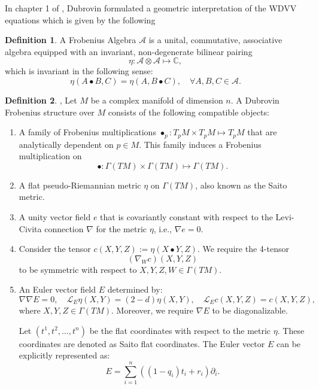 \documentclass{article}
\theoremstyle{definition}
\newtheorem{definition}{Definition}[section]
\begin{document}
In chapter 1 of \cite{B. Dubrovin2}, Dubrovin formulated a geometric interpretation of the WDVV equations which is given by the following

\begin{definition}
A Frobenius Algebra $\mathcal{A}$ is a unital, commutative, associative algebra equipped with an invariant, non-degenerate bilinear pairing 
\begin{equation*}
\eta : \mathcal{A} \otimes \mathcal{A} \mapsto \mathbb{C},
\end{equation*}
which is invariant in the following sense:
\begin{equation*}
\eta(A \bullet B, C) = \eta(A, B \bullet C), \quad \forall A, B, C \in \mathcal{A}.
\end{equation*}
\end{definition}


\begin{definition} \cite{B. Dubrovin2},\cite{B. Dubrovin3}
Let $M$ be a complex manifold of dimension $n$. A Dubrovin Frobenius structure over $M$ consists of the following compatible objects:
\begin{enumerate}
\item A family of Frobenius multiplications $\bullet_p : T_pM \times T_pM \mapsto T_pM$ that are analytically dependent on $p \in M$. This family induces a Frobenius multiplication on 
\begin{equation*}
\bullet : \Gamma(TM) \times \Gamma(TM) \mapsto \Gamma(TM).
\end{equation*}
\item A flat pseudo-Riemannian metric $\eta$ on $\Gamma(TM)$, also known as the Saito metric.
\item A unity vector field $e$ that is covariantly constant with respect to the Levi-Civita connection $\nabla$ for the metric $\eta$, i.e., $\nabla e = 0$.
\item Consider the tensor $c(X, Y, Z) := \eta(X \bullet Y, Z)$. We require the 4-tensor
\begin{equation*}
(\nabla_W c)(X, Y, Z)
\end{equation*}
to be symmetric with respect to $X, Y, Z, W \in \Gamma(TM)$.
\item An Euler vector field $E$ determined by:
\begin{equation*}
\nabla \nabla E = 0, \quad \mathcal{L}_E \eta(X, Y) = (2 - d) \eta(X, Y), \quad \mathcal{L}_E c(X, Y, Z) = c(X, Y, Z),
\end{equation*}
where $X, Y, Z \in \Gamma(TM)$. Moreover, we require $\nabla E$ to be diagonalizable.

Let $(t^1, t^2, \ldots, t^n)$ be the flat coordinates with respect to the metric $\eta$. These coordinates are denoted as Saito flat coordinates. The Euler vector $E$ can be explicitly represented as:
\begin{equation*}
E = \sum_{i=1}^n ((1 - q_i) t_i + r_i) \partial_i.
\end{equation*}
\end{enumerate}
\end{definition}
\end{document}
